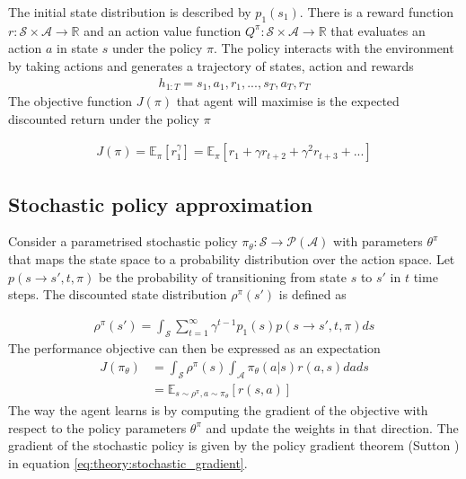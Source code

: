 \documentclass[class=book, crop=false, 11pt]{standalone}
\begin{document}
The initial state distribution is described by $p_{1}(s_{1})$. There is a reward function $r: \mathcal{S} \times \mathcal{A} \to \mathbb{R}$ and an action value function $Q^{\pi}:\mathcal{S} \times \mathcal{A} \to \mathbb{R}$ that evaluates an action $a$ in state $s$ under the policy $\pi$. The policy interacts with the environment by taking actions and generates a trajectory of states, action and rewards 
\begin{equation}
   \begin{aligned}\label{eq:theory:trajectory2}
h_{1:T} = s_{1},a_{1},r_{1},..., s_{T},a_{T},r_{T}
\end{aligned} 
\end{equation}
The objective function $J(\pi)$ that agent will maximise is the expected discounted return under the policy $\pi$

\begin{equation}
   \begin{aligned}\label{eq:theory:max_discounted_return}
J(\pi)
= \mathbb{E}_{\pi}[r^{\gamma}_{1}]
= \mathbb{E}_{\pi}[ r_{1} + \gamma r_{t+2} + \gamma^{2} r_{t+3} + ...]
\end{aligned} 
\end{equation}

\subsection{Stochastic policy approximation}\label{section:stochastic_policy_approx}
Consider a parametrised stochastic policy $\pi_{\theta}: \mathcal{S}\to \mathcal{P}(\mathcal{A})$ with parameters $\theta^{\pi}$ that maps the state space to a probability distribution over the action space. Let $p(s\to s',t,\pi)$ be the probability of transitioning from state $s$ to $s'$ in $t$ time steps. The discounted state distribution $\rho^{\pi}(s')$ is defined as   

\begin{equation}
   \begin{aligned}\label{eq:theory:discounted_state_distribution}
    \rho^{\pi}(s') = \int_{\mathcal{S}}\sum_{t=1}^{\infty }\gamma^{t-1}p_{1}(s)
    p(s \to s',t,\pi)ds
\end{aligned} 
\end{equation}
The performance objective can then be expressed as an expectation
\begin{equation}
   \begin{aligned}\label{eq:theory:objective_expected_stochastic}
    J(\pi_{\theta}) &= 
    \int_{\mathcal{S}}\rho^{\pi}(s) \int_{\mathcal{A}}\pi_{\theta}(a|s)r(a,s)da ds 
    \\
    &=
    \mathbb{E}_{s\sim \rho^{\pi},a \sim \pi_{\theta}}[r(s,a)]
\end{aligned} 
\end{equation}
 The way the agent learns is by computing the gradient of the objective with respect to the policy parameters $\theta^{\pi}$ and update the weights in that direction. The gradient of the stochastic policy is given by the policy gradient theorem (Sutton \cite{Sutton1998}) in equation \eqref{eq:theory:stochastic_gradient}.
\end{document}
